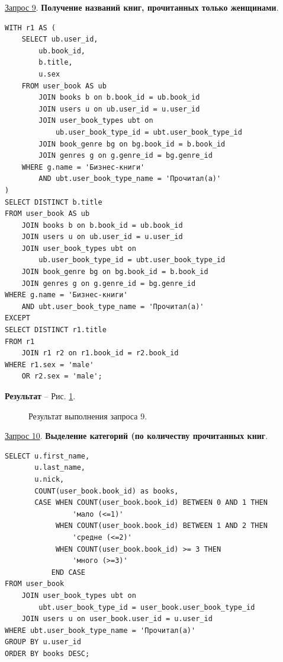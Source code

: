 \documentclass[a4paper,12pt]{article}
\begin{document}
\underline{Запрос 9}. \textbf{Получение названий книг, прочитанных только женщинами}.
\begin{lstlisting}
WITH r1 AS (
    SELECT ub.user_id,
        ub.book_id,
        b.title,
        u.sex
    FROM user_book AS ub
        JOIN books b on b.book_id = ub.book_id
        JOIN users u on ub.user_id = u.user_id
        JOIN user_book_types ubt on 
            ub.user_book_type_id = ubt.user_book_type_id
        JOIN book_genre bg on bg.book_id = b.book_id
        JOIN genres g on g.genre_id = bg.genre_id
    WHERE g.name = 'Бизнес-книги'
        AND ubt.user_book_type_name = 'Прочитал(а)'
)
SELECT DISTINCT b.title
FROM user_book AS ub
    JOIN books b on b.book_id = ub.book_id
    JOIN users u on ub.user_id = u.user_id
    JOIN user_book_types ubt on 
        ub.user_book_type_id = ubt.user_book_type_id
    JOIN book_genre bg on bg.book_id = b.book_id
    JOIN genres g on g.genre_id = bg.genre_id
WHERE g.name = 'Бизнес-книги'
    AND ubt.user_book_type_name = 'Прочитал(а)'
EXCEPT
SELECT DISTINCT r1.title
FROM r1
    JOIN r1 r2 on r1.book_id = r2.book_id
WHERE r1.sex = 'male'
    OR r2.sex = 'male';
    \end{lstlisting}

\textbf{Результат} -- Рис. \ref{fig:request9}.

\begin{figure}[ht]
    \caption{Результат выполнения запроса 9.}
    \label{fig:request9}
\end{figure}

\underline{Запрос 10}. \textbf{Выделение категорий (по количеству прочитанных книг}.
\begin{lstlisting}
SELECT u.first_name,
       u.last_name,
       u.nick,
       COUNT(user_book.book_id) as books,
       CASE WHEN COUNT(user_book.book_id) BETWEEN 0 AND 1 THEN
                'мало (<=1)'
            WHEN COUNT(user_book.book_id) BETWEEN 1 AND 2 THEN
                'средне (<=2)'
            WHEN COUNT(user_book.book_id) >= 3 THEN
                'много (>=3)'
           END CASE
FROM user_book
    JOIN user_book_types ubt on 
        ubt.user_book_type_id = user_book.user_book_type_id
    JOIN users u on user_book.user_id = u.user_id
WHERE ubt.user_book_type_name = 'Прочитал(а)'
GROUP BY u.user_id
ORDER BY books DESC;
    \end{lstlisting}
\end{document}
